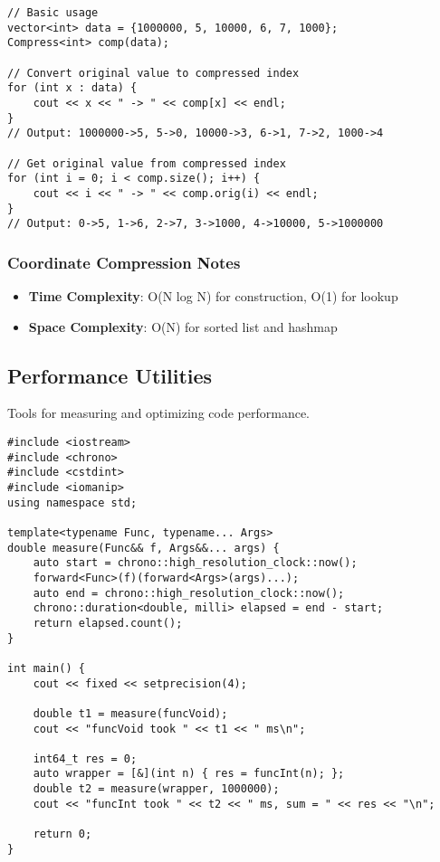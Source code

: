 \documentclass[11pt,a4paper]{article}
\begin{document}
\begin{lstlisting}[caption={Coordinate Compression Example}]
// Basic usage
vector<int> data = {1000000, 5, 10000, 6, 7, 1000};
Compress<int> comp(data);

// Convert original value to compressed index
for (int x : data) {
    cout << x << " -> " << comp[x] << endl;
}
// Output: 1000000->5, 5->0, 10000->3, 6->1, 7->2, 1000->4

// Get original value from compressed index
for (int i = 0; i < comp.size(); i++) {
    cout << i << " -> " << comp.orig(i) << endl;
}
// Output: 0->5, 1->6, 2->7, 3->1000, 4->10000, 5->1000000
\end{lstlisting}

\subsubsection*{Coordinate Compression Notes}
\begin{itemize}
\item \textbf{Time Complexity}: O(N log N) for construction, O(1) for lookup
\item \textbf{Space Complexity}: O(N) for sorted list and hashmap
\end{itemize}

\newpage

\subsection{Performance Utilities}
Tools for measuring and optimizing code performance.

\begin{lstlisting}[caption={Measure Time Utility}]
#include <iostream>
#include <chrono>
#include <cstdint>
#include <iomanip>  
using namespace std;

template<typename Func, typename... Args>
double measure(Func&& f, Args&&... args) {
    auto start = chrono::high_resolution_clock::now();
    forward<Func>(f)(forward<Args>(args)...);
    auto end = chrono::high_resolution_clock::now();
    chrono::duration<double, milli> elapsed = end - start;
    return elapsed.count();
}

int main() {
    cout << fixed << setprecision(4);

    double t1 = measure(funcVoid);
    cout << "funcVoid took " << t1 << " ms\n";

    int64_t res = 0;
    auto wrapper = [&](int n) { res = funcInt(n); };
    double t2 = measure(wrapper, 1000000);
    cout << "funcInt took " << t2 << " ms, sum = " << res << "\n";

    return 0;
}
\end{lstlisting}
\end{document}
